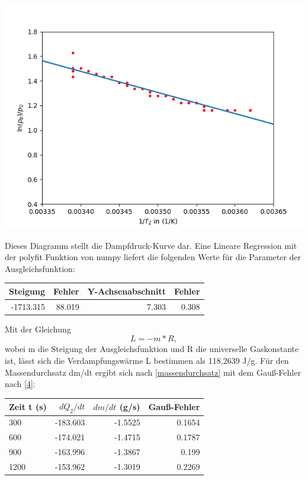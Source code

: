 \documentclass[titlepage=firstcover, captions=tableheading]{scrartcl}
\begin{document}
\begin{center}
    \includegraphics{massendurchsatz.png}
\end{center}
Dieses Diagramm stellt die Dampfdruck-Kurve dar.
Eine Lineare Regression mit der polyfit Funktion von numpy liefert die folgenden Werte für die Parameter der Ausgleichsfunktion: 
\begin{center}
    \begin{tabular}{r@{${}\pm{}$}rr@{${}\pm{}$}r}
        \toprule
        {Steigung} & {Fehler} & {Y-Achsenabschnitt} & {Fehler} \\
        \midrule
        -1713.315 & 88.019 & 7.303 & 0.308 \\
        \bottomrule
        
    \end{tabular}
\end{center}
Mit der Gleichung 
\begin{displaymath}
    L = -m*R ,
\end{displaymath}
wobei m die Steigung der Ausgleichsfunktion und R die universelle Gaskonstante ist,
lässt sich die Verdampfungswärme L bestimmen als 118,2639 J/g.
Für den Massendurchsatz dm/dt ergibt sich nach \eqref{massendurchsatz} mit dem Gauß-Fehler nach \eqref{4}: 
\begin{center}
    \begin{tabular}{lrrr}
        \toprule
        {Zeit t (s)} & {$dQ_2/dt$} & {$dm/dt$ (g/s)} & {Gauß-Fehler} \\
        \midrule
        300 & -183.603 & -1.5525 & 0.1654\\
        600 & -174.021 & -1.4715 & 0.1787\\
        900 & -163.996 & -1.3867 & 0.199\\
        1200& -153.962 & -1.3019 & 0.2269\\
        \bottomrule
        
    \end{tabular}
\end{center}
\end{document}
